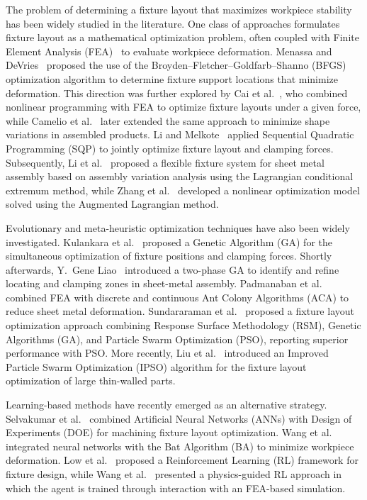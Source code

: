 \label{chap:pt1_state_of_the_art}

The problem of determining a fixture layout that maximizes workpiece stability has been widely studied in the literature. One class of approaches formulates fixture layout as a mathematical optimization problem, often coupled with Finite Element Analysis (FEA)~\cite{bhavikatti2005finite} to evaluate workpiece deformation. Menassa and DeVries~\cite{menassa1991optimization} proposed the use of the Broyden--Fletcher--Goldfarb--Shanno (BFGS) optimization algorithm to determine fixture support locations that minimize deformation. This direction was further explored by Cai et al.~\cite{cai1996deformable}, who combined nonlinear programming with FEA to optimize fixture layouts under a given force, while Camelio et al.~\cite{camelio2004impact} later extended the same approach to minimize shape variations in assembled products. Li and Melkote~\cite{li2001optimal} applied Sequential Quadratic Programming (SQP) to jointly optimize fixture layout and clamping forces. Subsequently, Li et al.~\cite{li2010variation} proposed a flexible fixture system for sheet metal assembly based on assembly variation analysis using the Lagrangian conditional extremum method, while Zhang et al.~\cite{zhang2010fixture} developed a nonlinear optimization model solved using the Augmented Lagrangian method.

Evolutionary and meta-heuristic optimization techniques have also been widely investigated. Kulankara et al.~\cite{kulankara2002iterative} proposed a Genetic Algorithm (GA) for the simultaneous optimization of fixture positions and clamping forces. Shortly afterwards, Y.~Gene Liao~\cite{liao2003genetic} introduced a two-phase GA to identify and refine locating and clamping zones in sheet-metal assembly. Padmanaban et al.~\cite{padmanaban2009machining} combined FEA with discrete and continuous Ant Colony Algorithms (ACA) to reduce sheet metal deformation. Sundararaman et al.~\cite{sundararaman2016optimization} proposed a fixture layout optimization approach combining Response Surface Methodology (RSM), Genetic Algorithms (GA), and Particle Swarm Optimization (PSO), reporting superior performance with PSO. More recently, Liu et al.~\cite{liu2024fixture} introduced an Improved Particle Swarm Optimization (IPSO) algorithm for the fixture layout optimization of large thin-walled parts.

Learning-based methods have recently emerged as an alternative strategy. Selvakumar et al.~\cite{selvakumar2013design} combined Artificial Neural Networks (ANNs) with Design of Experiments (DOE) for machining fixture layout optimization. Wang et al.~\cite{wang2016optimal} integrated neural networks with the Bat Algorithm (BA) to minimize workpiece deformation. Low et al.~\cite{low2020study} proposed a Reinforcement Learning (RL) framework for fixture design, while Wang et al.~\cite{wang2025smartfixture} presented a physics-guided RL approach in which the agent is trained through interaction with an FEA-based simulation.

